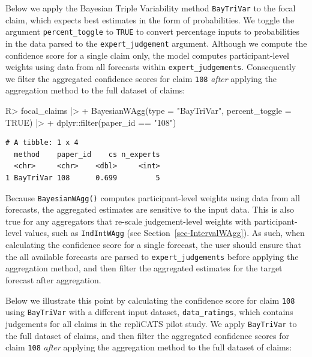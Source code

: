 \documentclass[
  11pt,
  a4paper,
]{article}
\newenvironment{Shaded}{\begin{snugshade}}{\end{snugshade}}
\newcommand{\AttributeTok}[1]{\textcolor[rgb]{0.40,0.45,0.13}{#1}}
\newcommand{\ConstantTok}[1]{\textcolor[rgb]{0.56,0.35,0.01}{#1}}
\newcommand{\FunctionTok}[1]{\textcolor[rgb]{0.28,0.35,0.67}{#1}}
\newcommand{\NormalTok}[1]{\textcolor[rgb]{0.00,0.23,0.31}{#1}}
\newcommand{\SpecialCharTok}[1]{\textcolor[rgb]{0.37,0.37,0.37}{#1}}
\newcommand{\StringTok}[1]{\textcolor[rgb]{0.13,0.47,0.30}{#1}}
\begin{document}
Below we apply the Bayesian Triple Variability method \texttt{BayTriVar}
to the focal claim, which expects best estimates in the form of
probabilities. We toggle the argument \texttt{percent\_toggle} to
\texttt{TRUE} to convert percentage inputs to probabilities in the data
parsed to the \texttt{expert\_judgement} argument. Although we compute
the confidence score for a single claim only, the model computes
participant-level weights using data from all forecasts within
\texttt{expert\_judgements}. Consequently we filter the aggregated
confidence scores for claim \texttt{108} \emph{after} applying the
aggregation method to the full dataset of claims:

\begin{Shaded}
\begin{Highlighting}[]
\NormalTok{R}\SpecialCharTok{\textgreater{}}\NormalTok{ focal\_claims }\SpecialCharTok{|\textgreater{}}
\SpecialCharTok{+}    \FunctionTok{BayesianWAgg}\NormalTok{(}\AttributeTok{type =} \StringTok{"BayTriVar"}\NormalTok{, }\AttributeTok{percent\_toggle =} \ConstantTok{TRUE}\NormalTok{) }\SpecialCharTok{|\textgreater{}}
\SpecialCharTok{+}\NormalTok{    dplyr}\SpecialCharTok{::}\FunctionTok{filter}\NormalTok{(paper\_id }\SpecialCharTok{==} \StringTok{"108"}\NormalTok{)}
\end{Highlighting}
\end{Shaded}

\begin{verbatim}
# A tibble: 1 x 4
  method    paper_id    cs n_experts
  <chr>     <chr>    <dbl>     <int>
1 BayTriVar 108      0.699         5
\end{verbatim}

Because \texttt{BayesianWAgg()} computes participant-level weights using
data from all forecasts, the aggregated estimates are sensitive to the
input data. This is also true for any aggregators that re-scale
judgement-level weights with participant-level values, such as
\texttt{IndIntWAgg} (see Section~\ref{sec-IntervalWAgg}). As such, when
calculating the confidence score for a single forecast, the user should
ensure that the all available forecasts are parsed to
\texttt{expert\_judgements} before applying the aggregation method, and
then filter the aggregated estimates for the target forecast after
aggregation.

Below we illustrate this point by calculating the confidence score for
claim \texttt{108} using \texttt{BayTriVar} with a different input
dataset, \texttt{data\_ratings}, which contains judgements for all
claims in the repliCATS pilot study. We apply \texttt{BayTriVar} to the
full dataset of claims, and then filter the aggregated confidence scores
for claim \texttt{108} \emph{after} applying the aggregation method to
the full dataset of claims:
\end{document}

